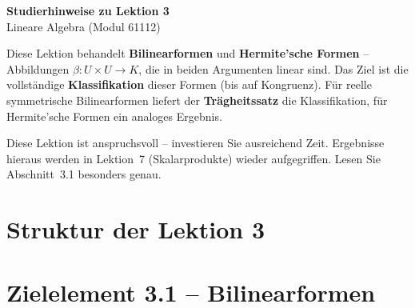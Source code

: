 \documentclass[a4paper,12pt]{article}
\begin{document}
\begin{center}
  {\LARGE\bfseries Studierhinweise zu Lektion 3}\\[0.5em]
  {\large Lineare Algebra (Modul 61112)}
\end{center}

\vspace{0.8em}

Diese Lektion behandelt \textbf{Bilinearformen} und \textbf{Hermite'sche Formen} -- Abbildungen
$\beta: U \times U \to K$, die in beiden Argumenten linear sind. Das Ziel ist die vollständige
\textbf{Klassifikation} dieser Formen (bis auf Kongruenz). Für reelle symmetrische Bilinearformen
liefert der \textbf{Trägheitssatz} die Klassifikation, für Hermite'sche Formen ein analoges Ergebnis.

Diese Lektion ist anspruchsvoll -- investieren Sie ausreichend Zeit. Ergebnisse hieraus werden
in Lektion~7 (Skalarprodukte) wieder aufgegriffen. Lesen Sie Abschnitt~3.1 besonders genau.

\section*{Struktur der Lektion 3}

\begin{center}
\end{center}

\newpage

\section*{Zielelement 3.1 -- Bilinearformen}
\end{document}
